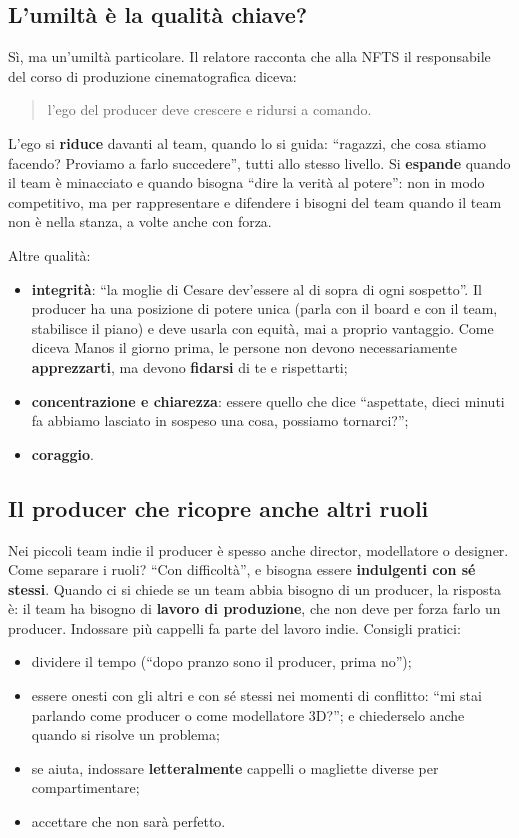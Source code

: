 \subsection{L'umiltà è la qualità chiave?}

Sì, ma un'umiltà particolare. Il relatore racconta che alla NFTS il responsabile del
corso di produzione cinematografica diceva:
\begin{quote}
l'ego del producer deve crescere e ridursi a comando.
\end{quote}
L'ego si \textbf{riduce} davanti al team, quando lo si guida: ``ragazzi, che cosa
stiamo facendo? Proviamo a farlo succedere'', tutti allo stesso livello. Si
\textbf{espande} quando il team è minacciato e quando bisogna ``dire la verità al
potere'': non in modo competitivo, ma per rappresentare e difendere i bisogni del
team quando il team non è nella stanza, a volte anche con forza.

Altre qualità:
\begin{itemize}
  \item \textbf{integrità}: ``la moglie di Cesare dev'essere al di sopra di ogni
        sospetto''. Il producer ha una posizione di potere unica (parla con il board
        e con il team, stabilisce il piano) e deve usarla con equità, mai a proprio
        vantaggio. Come diceva Manos il giorno prima, le persone non devono
        necessariamente \textbf{apprezzarti}, ma devono \textbf{fidarsi} di te e
        rispettarti;
  \item \textbf{concentrazione e chiarezza}: essere quello che dice ``aspettate,
        dieci minuti fa abbiamo lasciato in sospeso una cosa, possiamo tornarci?'';
  \item \textbf{coraggio}.
\end{itemize}

\subsection{Il producer che ricopre anche altri ruoli}

Nei piccoli team indie il producer è spesso anche director, modellatore o
designer. Come separare i ruoli? ``Con difficoltà'', e bisogna essere
\textbf{indulgenti con sé stessi}. Quando ci si chiede se un team abbia bisogno di
un producer, la risposta è: il team ha bisogno di \textbf{lavoro di produzione},
che non deve per forza farlo un producer. Indossare più cappelli fa parte del
lavoro indie. Consigli pratici:
\begin{itemize}
  \item dividere il tempo (``dopo pranzo sono il producer, prima no'');
  \item essere onesti con gli altri e con sé stessi nei momenti di conflitto: ``mi
        stai parlando come producer o come modellatore 3D?''; e chiederselo anche
        quando si risolve un problema;
  \item se aiuta, indossare \textbf{letteralmente} cappelli o magliette diverse per
        compartimentare;
  \item accettare che non sarà perfetto.
\end{itemize}

